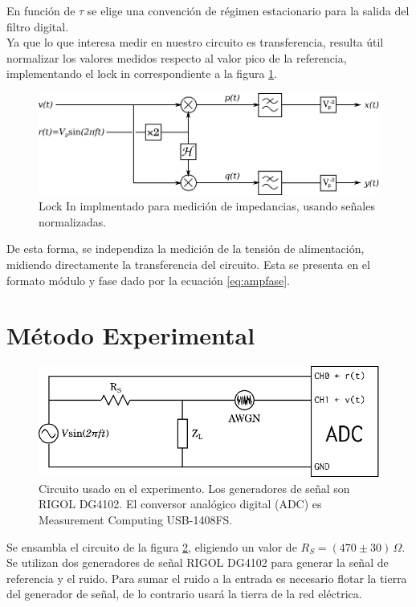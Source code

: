 \documentclass[11pt,a4paper]{extarticle}
\begin{document}
\begin{multicols}{2}
En función de $\tau$ se elige una convención de régimen estacionario para la salida del filtro digital.\\

Ya que lo que interesa medir en nuestro circuito es transferencia, resulta útil normalizar los valores medidos respecto al valor pico de la referencia, implementando el lock in correspondiente a la figura \ref{fig:nuestro_lockin}.

\begin{figure}[H]
	\centering
	\includegraphics[width=\linewidth]{Images/nuestro_lockin.eps}
	\caption{Lock In implmentado para medición de impedancias, usando señales normalizadas.}
	\label{fig:nuestro_lockin}
\end{figure}

De esta forma, se independiza la medición de la tensión de alimentación, midiendo directamente la transferencia del circuito. 
Esta se presenta en el formato módulo y fase dado por la ecuación \ref{eq:ampfase}.

\section{Método Experimental}

\begin{figure}[H]
	\centering
	\includegraphics[width=\linewidth]{Images/circuito.eps}
	\caption{Circuito usado en el experimento. Los generadores de señal son RIGOL DG4102. El conversor analógico digital (ADC) es Measurement Computing USB-1408FS.}
	\label{fig:circuito}
\end{figure}

Se ensambla el circuito de la figura \ref{fig:circuito}, eligiendo un valor de $R_S = (470 \pm 30)\, \Omega$. 
Se utilizan dos generadores de señal RIGOL DG4102 
para generar la señal de referencia y el ruido.
Para sumar el ruido a la entrada es necesario flotar la 
tierra del generador de señal, de lo contrario usará la tierra de la red eléctrica.\\


\end{multicols}
\end{document}
